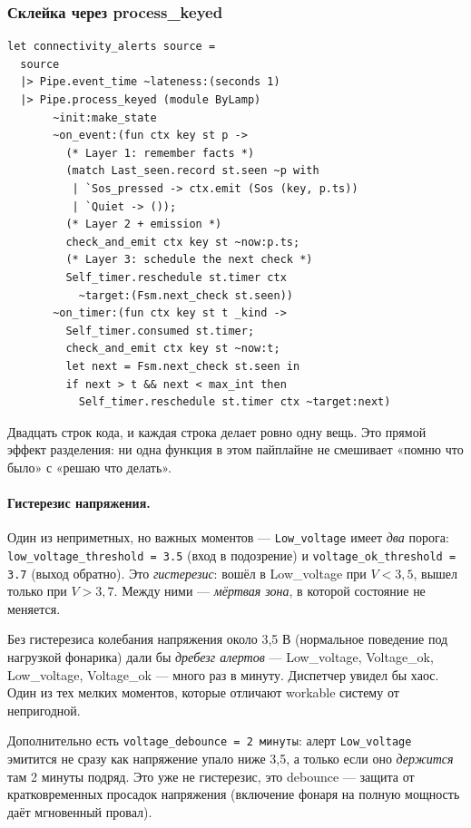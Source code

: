 \subsubsection{Склейка через process\_keyed}

\begin{lstlisting}
let connectivity_alerts source =
  source
  |> Pipe.event_time ~lateness:(seconds 1)
  |> Pipe.process_keyed (module ByLamp)
       ~init:make_state
       ~on_event:(fun ctx key st p ->
         (* Layer 1: remember facts *)
         (match Last_seen.record st.seen ~p with
          | `Sos_pressed -> ctx.emit (Sos (key, p.ts))
          | `Quiet -> ());
         (* Layer 2 + emission *)
         check_and_emit ctx key st ~now:p.ts;
         (* Layer 3: schedule the next check *)
         Self_timer.reschedule st.timer ctx
           ~target:(Fsm.next_check st.seen))
       ~on_timer:(fun ctx key st t _kind ->
         Self_timer.consumed st.timer;
         check_and_emit ctx key st ~now:t;
         let next = Fsm.next_check st.seen in
         if next > t && next < max_int then
           Self_timer.reschedule st.timer ctx ~target:next)
\end{lstlisting}

Двадцать строк кода, и каждая строка делает ровно одну вещь. Это
прямой эффект разделения: ни одна функция в этом пайплайне не
смешивает «помню что было» с «решаю что делать».

\paragraph{Гистерезис напряжения.} Один из неприметных, но важных
моментов --- \texttt{Low\_voltage} имеет \emph{два} порога:
\texttt{low\_voltage\_threshold = 3.5} (вход в подозрение) и
\texttt{voltage\_ok\_threshold = 3.7} (выход обратно). Это
\emph{гистерезис}: вошёл в Low\_voltage при $V < 3{,}5$, вышел только
при $V > 3{,}7$. Между ними --- \emph{мёртвая зона}, в которой
состояние не меняется.

Без гистерезиса колебания напряжения около 3{,}5 В (нормальное
поведение под нагрузкой фонарика) дали бы \emph{дребезг алертов} ---
Low\_voltage, Voltage\_ok, Low\_voltage, Voltage\_ok --- много раз в
минуту. Диспетчер увидел бы хаос. Один из тех мелких моментов,
которые отличают workable систему от непригодной.

Дополнительно есть \texttt{voltage\_debounce = 2 минуты}: алерт
\texttt{Low\_voltage} эмитится не сразу как напряжение упало ниже 3{,}5,
а только если оно \emph{держится} там 2 минуты подряд. Это уже не
гистерезис, это debounce --- защита от кратковременных просадок
напряжения (включение фонаря на полную мощность даёт мгновенный
провал).

